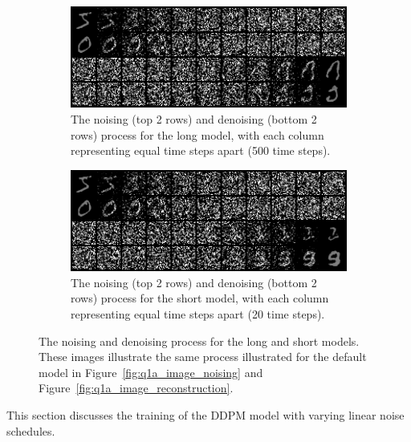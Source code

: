 \begin{figure}
\centering
\begin{subfigure}{0.8\textwidth}
    \centering
    \includegraphics[width=1\textwidth]{./figures/q1b_long_model_nd}
    \caption{The noising (top 2 rows) and denoising (bottom 2 rows) process for the long model, with each column
        representing equal time steps apart (500 time steps).}
    \label{fig:q1b_long_model_nd}
\end{subfigure}%
\hfill
\begin{subfigure}{0.8\textwidth}
    \centering
    \includegraphics[width=1\textwidth]{./figures/q1b_short_model_nd}
    \caption{The noising (top 2 rows) and denoising (bottom 2 rows) process for the short model, with each column
        representing equal time steps apart (20 time steps).}
    \label{fig:q1b_short_model_nd}
\end{subfigure}
\caption{The noising and denoising process for the long and short models.
    These images illustrate the same process illustrated for the default model in Figure~\eqref{fig:q1a_image_noising}
    and Figure~\eqref{fig:q1a_image_reconstruction}.}
\label{fig:q1b_short_long_model_nd}
\end{figure}

This section discusses the training of the DDPM model with varying linear noise schedules.

